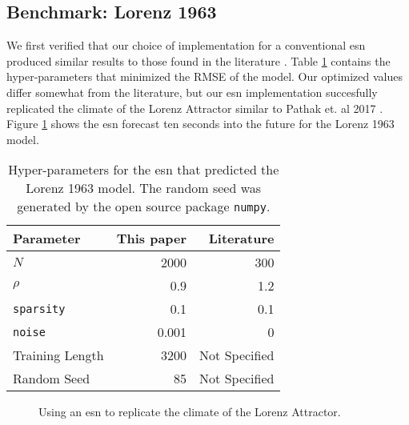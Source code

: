 \subsection{Benchmark: Lorenz 1963}

We first verified that our choice of implementation for a conventional \gls{esn}
produced similar results to those found in the literature
\cite{pathak_using_2017}. Table \ref{tab:lorenzparam} contains the hyper-parameters
that minimized the RMSE of the model. Our optimized values differ
somewhat from the literature, but our \gls{esn} implementation
succesfully replicated the climate of the Lorenz Attractor similar to Pathak
et. al 2017 \cite{pathak_using_2017}. Figure \ref{fig:lorenz63} shows the
\gls{esn} forecast ten seconds into the future for the Lorenz 1963 model.


\begin{table}[H]
  \centering
  \caption{Hyper-parameters for the \gls{esn} that predicted the Lorenz 1963
  model. The random seed was generated by the open source package
  \texttt{numpy}.}
  \label{tab:lorenzparam}
  \begin{tabular}{l r r}
    \hline
    Parameter & This paper & Literature \cite{pathak_using_2017}\\
    \hline
    $N$ & 2000& 300\\
    $\rho$& 0.9&1.2\\
    \texttt{sparsity}& 0.1& 0.1\\
    \texttt{noise}& 0.001& 0\\
    Training Length & 3200& Not Specified\\
    Random Seed & 85 & Not Specified\\
    \hline
  \end{tabular}
\end{table}
\begin{figure}[H]
  \centering
  \resizebox{\columnwidth}{!}{}
  \caption{Using an \gls{esn} to replicate the climate of the Lorenz Attractor.}
  \label{fig:lorenz63}
\end{figure}
